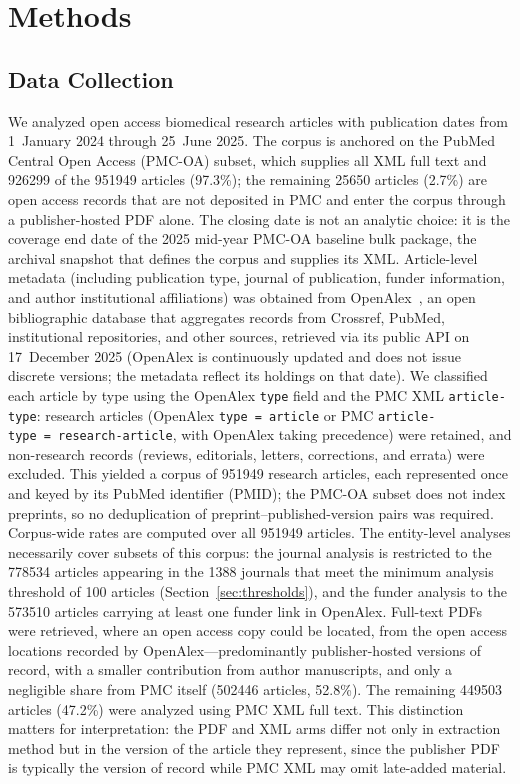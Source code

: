 \section{Methods}

\subsection{Data Collection}

We analyzed open access biomedical research articles with publication dates from 1~January 2024 through 25~June 2025. The corpus is anchored on the PubMed Central Open Access (PMC-OA) subset, which supplies all XML full text and \num{926299} of the \num{951949} articles (97.3\%); the remaining \num{25650} articles (2.7\%) are open access records that are not deposited in PMC and enter the corpus through a publisher-hosted PDF alone. The closing date is not an analytic choice: it is the coverage end date of the 2025 mid-year PMC-OA baseline bulk package, the archival snapshot that defines the corpus and supplies its XML. Article-level metadata (including publication type, journal of publication, funder information, and author institutional affiliations) was obtained from OpenAlex~\cite{Priem2022-wr}, an open bibliographic database that aggregates records from Crossref, PubMed, institutional repositories, and other sources, retrieved via its public API on 17~December 2025 (OpenAlex is continuously updated and does not issue discrete versions; the metadata reflect its holdings on that date). We classified each article by type using the OpenAlex \texttt{type} field and the PMC XML \texttt{article-type}: research articles (OpenAlex \texttt{type~=~article} or PMC \texttt{article-type~=~research-article}, with OpenAlex taking precedence) were retained, and non-research records (reviews, editorials, letters, corrections, and errata) were excluded. This yielded a corpus of \num{951949} research articles, each represented once and keyed by its PubMed identifier (PMID); the PMC-OA subset does not index preprints, so no deduplication of preprint--published-version pairs was required. Corpus-wide rates are computed over all \num{951949} articles. The entity-level analyses necessarily cover subsets of this corpus: the journal analysis is restricted to the \num{778534} articles appearing in the \num{1388} journals that meet the minimum analysis threshold of 100 articles (Section~\ref{sec:thresholds}), and the funder analysis to the \num{573510} articles carrying at least one funder link in OpenAlex. Full-text PDFs were retrieved, where an open access copy could be located, from the open access locations recorded by OpenAlex---predominantly publisher-hosted versions of record, with a smaller contribution from author manuscripts, and only a negligible share from PMC itself (\num{502446} articles, 52.8\%). The remaining \num{449503} articles (47.2\%) were analyzed using PMC XML full text. This distinction matters for interpretation: the PDF and XML arms differ not only in extraction method but in the version of the article they represent, since the publisher PDF is typically the version of record while PMC XML may omit late-added material.

